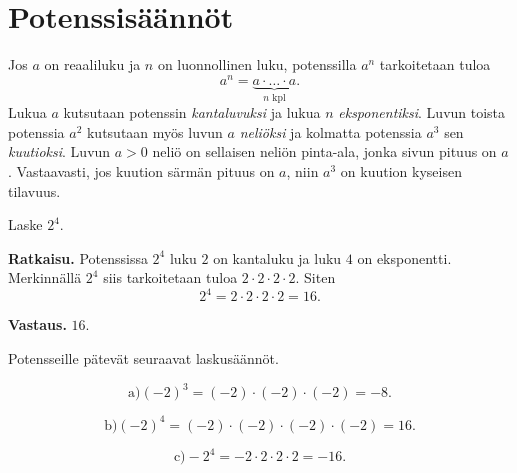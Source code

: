 \chapter{Potenssisäännöt}

Jos $a$ on reaaliluku ja $n$ on luonnollinen luku, potenssilla $a^n$ tarkoitetaan tuloa
\[
a^n = \underbrace{a\cdot \ldots \cdot a}_{n\text{ kpl}}. 
\]
Lukua $a$ kutsutaan potenssin \emph{kantaluvuksi} ja lukua $n$ \emph{eksponentiksi}. Luvun toista potenssia $a^2$ kutsutaan myös luvun $a$ \emph{neliöksi} ja kolmatta potenssia $a^3$ sen \emph{kuutioksi}. Luvun $a>0$ neliö on sellaisen neliön pinta-ala, jonka sivun pituus on $a$. Vastaavasti, jos kuution särmän pituus on $a$, niin $a^3$ on kuution kyseisen tilavuus.

\begin{esimerkki}
Laske $2^4$.

{\bf Ratkaisu.}
Potenssissa $2^4$ luku $2$ on kantaluku ja luku $4$ on eksponentti.
Merkinnällä $2^4$ siis tarkoitetaan tuloa $2\cdot 2\cdot 2\cdot 2$. Siten
\[
2^4=2\cdot 2\cdot 2\cdot 2=16.
\]

{\bf Vastaus.} $16$.
\end{esimerkki}

Potensseille pätevät seuraavat laskusäännöt.



\begin{esimerkki}
\begin{equation}
\text{a)} (-2)^3=(-2)\cdot (-2)\cdot (-2)=-8.
\end{equation}

\begin{equation}
\text{b)} (-2)^4=(-2)\cdot (-2)\cdot (-2)\cdot (-2)=16.
\end{equation}

\begin{equation}
\text{c)} -2^4=-2\cdot 2\cdot 2\cdot 2=-16.
\end{equation}
\end{esimerkki}

